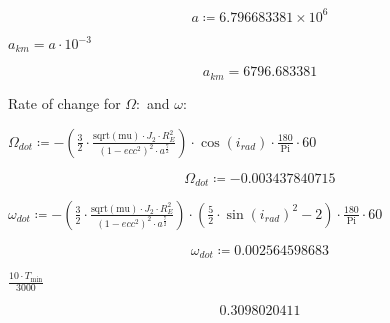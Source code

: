 \begin{appendices}
\begin{dmath}\label{(3)}
a \coloneqq  6.796683381\times 10^{6}
\end{dmath}
\begin{Maple Normal}
{$ \displaystyle a_{\mathit{km}}=a \cdot 10^{-3} $}
\end{Maple Normal}
\begin{dmath}\label{(4)}
a_{\mathit{km}}= 6796.683381
\end{dmath}
\begin{Maple Normal}
Rate of change for 
{$ \Omega \colon  $} and 
{$ \omega \colon  $}
\end{Maple Normal}
\begin{Maple Normal}
{$ \displaystyle \Omega_{\mathit{dot}}\coloneqq -(\frac{3}{2}\cdot \frac{\mathrm{sqrt}(\mathrm{mu})\cdot J_{2}\cdot R_{E}^{2}}{(1-\mathit{ecc}^{2})^{2}\cdot a^{\frac{7}{2}}})\cdot \cos (i_{\mathit{rad}})\cdot \frac{180}{\mathrm{Pi}}\cdot 60 $}
\end{Maple Normal}
\begin{dmath}\label{(5)}
\Omega_{\mathit{dot}}\coloneqq - 0.003437840715
\end{dmath}
\begin{Maple Normal}
{$ \displaystyle \omega_{\mathit{dot}}\coloneqq -(\frac{3}{2}\cdot \frac{\mathrm{sqrt}(\mathrm{mu})\cdot J_{2}\cdot R_{E}^{2}}{(1-\mathit{ecc}^{2})^{2}\cdot a^{\frac{7}{2}}})\cdot (\frac{5}{2}\cdot \sin(i_{\mathit{rad}})^{2}-2)\cdot \frac{180}{\mathrm{Pi}}\cdot 60 $}
\end{Maple Normal}
\begin{dmath}\label{(6)}
\omega_{\mathit{dot}}\coloneqq  0.002564598683
\end{dmath}
\begin{Maple Normal}

\end{Maple Normal}
\begin{Maple Normal}

\end{Maple Normal}
\begin{Maple Normal}
{$ \displaystyle \frac{10\cdot T_{\min}}{3000} $}
\end{Maple Normal}
\begin{dmath}\label{(7)}
 0.3098020411
\end{dmath}
\begin{Maple Normal}

\end{Maple Normal}




\end{appendices}
